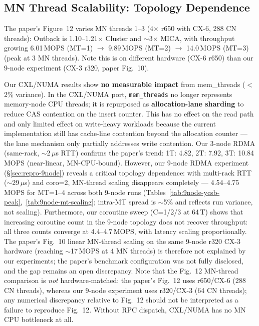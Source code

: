 \documentclass[conference]{IEEEtran}
\begin{document}
\subsection{MN Thread Scalability: Topology Dependence}

The paper's Figure~12 varies MN threads 1--3 (4$\times$ r650 with CX-6, 288 CN threads): Outback is 1.10--1.21$\times$ Cluster and $\sim$3$\times$ MICA, with throughput growing 6.01\,MOPS (MT=1) $\to$ 9.89\,MOPS (MT=2) $\to$ 14.0\,MOPS (MT=3) (peak at 3 MN threads). Note this is on different hardware (CX-6 r650) than our 9-node experiment (CX-3 r320, paper Fig.~10).

Our CXL/NUMA results show \textbf{no measurable impact} from mem\_threads ($<$2\% variance). In the CXL/NUMA port, \texttt{mem\_threads} no longer represents memory-node CPU threads; it is repurposed as \textbf{allocation-lane sharding} to reduce CAS contention on the insert counter. This has no effect on the read path and only limited effect on write-heavy workloads because the current implementation still has cache-line contention beyond the allocation counter --- the lane mechanism only partially addresses write contention. Our 3-node RDMA (same-rack, $\sim$2\,$\mu$s RTT) confirms the paper's trend: 1T: 4.82, 2T: 7.92, 3T: 10.84\,MOPS (near-linear, MN-CPU-bound). However, our 9-node RDMA experiment (\S\ref{sec:repro-9node}) reveals a critical topology dependence: with multi-rack RTT ($\sim$29\,$\mu$s) and coro=2, MN-thread scaling disappears completely --- 4.54--4.75\,MOPS for MT=1--4 across both 9-node runs (Tables~\ref{tab:9node-ycsb-peak},~\ref{tab:9node-mt-scaling}; intra-MT spread is $\sim$5\% and reflects run variance, not scaling). Furthermore, our coroutine sweep (C=1/2/3 at 64\,T) shows that increasing coroutine count in the 9-node topology does not recover throughput: all three counts converge at 4.4--4.7\,MOPS, with latency scaling proportionally. The paper's Fig.~10 linear MN-thread scaling on the same 9-node r320 CX-3 hardware (reaching $\sim$17\,MOPS at 4 MN threads) is therefore not explained by our experiments; the paper's benchmark configuration was not fully disclosed, and the gap remains an open discrepancy. Note that the Fig.~12 MN-thread comparison is \emph{not} hardware-matched: the paper's Fig.~12 uses r650/CX-6 (288 CN threads), whereas our 9-node experiment uses r320/CX-3 (64 CN threads); any numerical discrepancy relative to Fig.~12 should not be interpreted as a failure to reproduce Fig.~12. Without RPC dispatch, CXL/NUMA has no MN CPU bottleneck at all.
\end{document}
